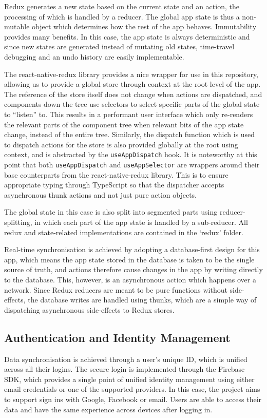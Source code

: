 Redux generates a new state based on the current state and an action, the processing of which is handled by a reducer. The global app state is thus a non-mutable object which determines how the rest of the app behaves. Immutability provides many benefits. In this case, the app state is always deterministic and since new states are generated instead of mutating old states, time-travel debugging and an undo history are easily implementable.

The react-native-redux library provides a nice wrapper for use in this repository, allowing us to provide a global store through context at the root level of the app. The reference of the store itself does not change when actions are dispatched, and components down the tree use selectors to select specific parts of the global state to ``listen'' to. This results in a performant user interface which only re-renders the relevant parts of the component tree when relevant bits of the app state change, instead of the entire tree. Similarly, the dispatch function which is used to dispatch actions for the store is also provided globally at the root using context, and is abstracted by the \texttt{useAppDispatch} hook. It is noteworthy at this point that both \texttt{useAppDispatch} and \texttt{useAppSelector} are wrappers around their base counterparts from the react-native-redux library. This is to ensure appropriate typing through TypeScript so that the dispatcher accepts asynchronous thunk actions and not just pure action objects.

The global state in this case is also split into segmented parts using reducer-splitting, in which each part of the app state is handled by a sub-reducer. All redux and state-related implementations are contained in the `redux' folder.

Real-time synchronisation is achieved by adopting a database-first design for this app, which means the app state stored in the database is taken to be the single source of truth, and actions therefore cause changes in the app by writing directly to the database. This, however, is an asynchronous action which happens over a network. Since Redux reducers are meant to be pure functions without side-effects, the database writes are handled using thunks, which are a simple way of dispatching asynchronous side-effects to Redux stores.


\subsection{Authentication and Identity Management}
Data synchronisation is achieved through a user's unique ID, which is unified across all their logins. The secure login is implemented through the Firebase SDK, which provides a single point of unified identity management using either email credentials or one of the supported providers. In this case, the project aims to support sign ins with Google, Facebook or email. Users are able to access their data and have the same experience across devices after logging in.

